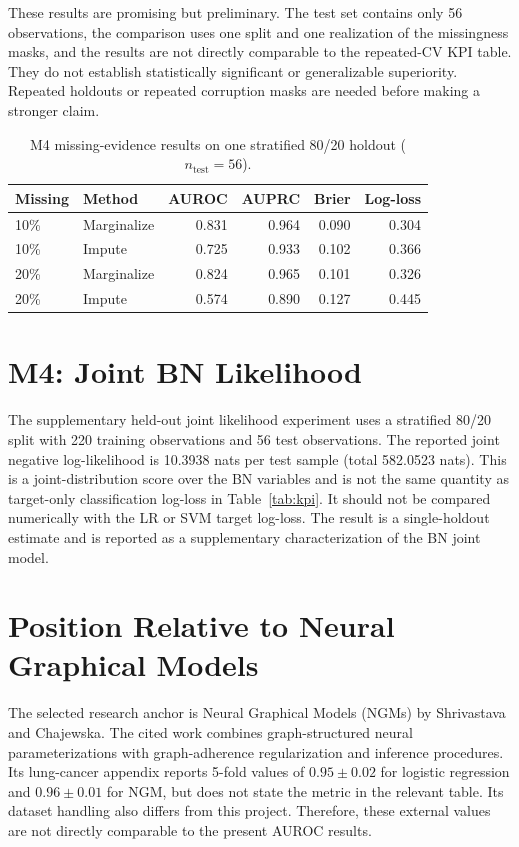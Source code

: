 \documentclass[conference]{IEEEtran}
\begin{document}
These results are promising but preliminary. The test set contains only 56 observations, the comparison uses one split and one realization of the missingness masks, and the results are not directly comparable to the repeated-CV KPI table. They do not establish statistically significant or generalizable superiority. Repeated holdouts or repeated corruption masks are needed before making a stronger claim.

\begin{table}[t]
\centering
\caption{M4 missing-evidence results on one stratified 80/20 holdout ($n_{\mathrm{test}}=56$).}
\label{tab:missing}
\small
\begin{tabular}{llrrrr}
\toprule
Missing & Method & AUROC & AUPRC & Brier & Log-loss\\
\midrule
10\% & Marginalize & 0.831 & 0.964 & 0.090 & 0.304\\
10\% & Impute & 0.725 & 0.933 & 0.102 & 0.366\\
20\% & Marginalize & 0.824 & 0.965 & 0.101 & 0.326\\
20\% & Impute & 0.574 & 0.890 & 0.127 & 0.445\\
\bottomrule
\end{tabular}
\end{table}





\section{M4: Joint BN Likelihood}
The supplementary held-out joint likelihood experiment uses a stratified 80/20 split with 220 training observations and 56 test observations. The reported joint negative log-likelihood is 10.3938 nats per test sample (total 582.0523 nats). This is a joint-distribution score over the BN variables and is not the same quantity as target-only classification log-loss in Table~\ref{tab:kpi}. It should not be compared numerically with the LR or SVM target log-loss. The result is a single-holdout estimate and is reported as a supplementary characterization of the BN joint model.

\section{Position Relative to Neural Graphical Models}
The selected research anchor is Neural Graphical Models (NGMs) by Shrivastava and Chajewska. The cited work combines graph-structured neural parameterizations with graph-adherence regularization and inference procedures. Its lung-cancer appendix reports 5-fold values of $0.95\pm0.02$ for logistic regression and $0.96\pm0.01$ for NGM, but does not state the metric in the relevant table. Its dataset handling also differs from this project. Therefore, these external values are not directly comparable to the present AUROC results.
\end{document}
